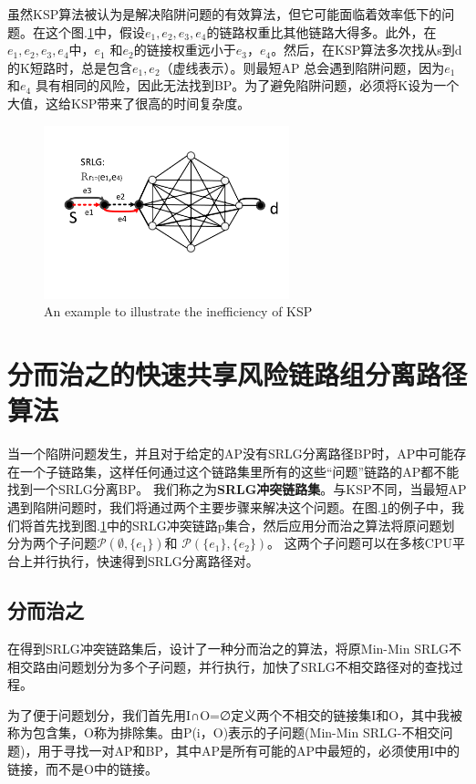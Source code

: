 虽然KSP算法被认为是解决陷阱问题的有效算法，但它可能面临着效率低下的问题。在这个图.\ref{fig:KSPproblem}中，假设$e_1, e_2, e_3, e_4$的链路权重比其他链路大得多。此外，在$e_1, e_2, e_3, e_4$中，$e_1$ 和$e_2$的链接权重远小于$e_3$，$e_4$。然后，在KSP算法多次找从s到d的K短路时，总是包含$e_1,e_2$（虚线表示）。则最短AP 总会遇到陷阱问题，因为$e_1$和$e_4$ 具有相同的风险，因此无法找到BP。为了避免陷阱问题，必须将K设为一个大值，这给KSP带来了很高的时间复杂度。
\begin{figure}[htbp]
\centering
\includegraphics[width=2.8in]{figures/KSPproblem}
  \caption{An example to illustrate the inefficiency of KSP}
  \label{fig:KSPproblem}
\end{figure}


\section{分而治之的快速共享风险链路组分离路径算法}
当一个陷阱问题发生，并且对于给定的AP没有SRLG分离路径BP时，AP中可能存在一个子链路集，这样任何通过这个链路集里所有的这些“问题”链路的AP都不能找到一个SRLG分离BP。 我们称之为\textbf{SRLG冲突链路集}。与KSP不同，当最短AP遇到陷阱问题时，我们将通过两个主要步骤来解决这个问题。在图.\ref{fig:KSPproblem}的例子中，我们将首先找到图.\ref{fig:KSPproblem}中的SRLG冲突链路p集合，然后应用分而治之算法将原问题划分为两个子问题$\mathcal{P}(\emptyset,\{e_1\})$和 $\mathcal{P}(\{e_1\},\{e_2\})$。 这两个子问题可以在多核CPU平台上并行执行，快速得到SRLG分离路径对。
\subsection{分而治之}
在得到SRLG冲突链路集后，设计了一种分而治之的算法，将原Min-Min SRLG不相交路由问题划分为多个子问题，并行执行，加快了SRLG不相交路径对的查找过程。

为了便于问题划分，我们首先用I∩O=∅定义两个不相交的链接集I和O，其中我被称为包含集，O称为排除集。由P(i，O)表示的子问题(Min-Min SRLG-不相交问题)，用于寻找一对AP和BP，其中AP是所有可能的AP中最短的，必须使用I中的链接，而不是O中的链接。

